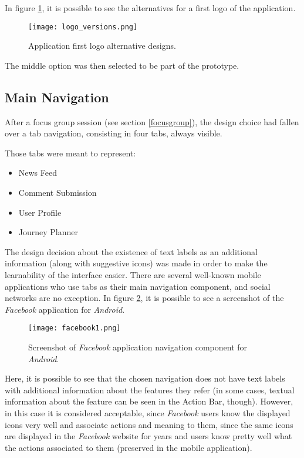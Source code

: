 In figure \ref{fig:logo}, it is possible to see the alternatives for a first logo of the application. 

\begin{figure}[htb]
  \begin{center}
    \leavevmode
    \texttt{[image: logo\_versions.png]}
    \caption{Application first logo alternative designs.}
    \label{fig:logo}
  \end{center}
\end{figure}

The middle option was then selected to be part of the prototype.


\subsection{Main Navigation}

After a focus group session (see section \ref{focusgroup}), the design choice had fallen over a tab navigation, consisting in four tabs, always visible.

Those tabs were meant to represent:

\begin{itemize}
\item News Feed
\item Comment Submission
\item User Profile
\item Journey Planner
\end{itemize}

The design decision about the existence of text labels as an additional information (along with suggestive icons) was made in order to make the learnability of the interface easier. There are several well-known mobile applications who use tabs as their main navigation component, and social networks are no exception. In figure \ref{fig:facebook1}, it is possible to see a screenshot of the \emph{Facebook} application for \emph{Android}. 

\begin{figure}[htb]
  \begin{center}
    \leavevmode
    \texttt{[image: facebook1.png]}
    \caption{Screenshot of \emph{Facebook} application navigation component for \emph{Android}.}
    \label{fig:facebook1}
  \end{center}
\end{figure}

Here, it is possible to see that the chosen navigation does not have text labels with additional information about the features they refer (in some cases, textual information about the feature can be seen in the Action Bar, though). However, in this case it is considered acceptable, since \emph{Facebook} users know the displayed icons very well and associate actions and meaning to them, since the same icons are displayed in the \emph{Facebook} website for years and users know pretty well what the actions associated to them (preserved in the mobile application).


